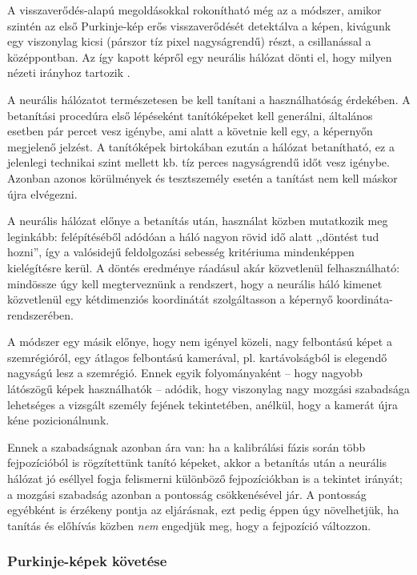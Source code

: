 \bigskip

A visszaverődés-alapú megoldásokkal rokonítható még az a módszer, amikor szintén az első Purkinje-kép erős visszaverődését detektálva a képen, kivágunk egy viszonylag kicsi (párszor tíz pixel nagyságrendű) részt, a csillanással a középpontban. Az így kapott képről egy neurális hálózat dönti el, hogy milyen nézeti irányhoz tartozik \cite{baluja}.

A neurális hálózatot természetesen be kell tanítani a használhatóság érdekében. A betanítási procedúra első lépéseként tanítóképeket kell generálni, általános esetben pár percet vesz igénybe, ami alatt a követnie kell egy, a képernyőn megjelenő jelzést. A tanítóképek birtokában ezután a hálózat betanítható, ez a jelenlegi technikai szint mellett kb. tíz perces nagyságrendű időt vesz igénybe. Azonban azonos körülmények és tesztszemély esetén a tanítást nem kell máskor újra elvégezni.

A neurális hálózat előnye a betanítás után, használat közben mutatkozik meg leginkább: felépítéséből adódóan a háló nagyon rövid idő alatt ,,döntést tud hozni'', így a valósidejű feldolgozási sebesség kritériuma mindenképpen kielégítésre kerül. A döntés eredménye ráadásul akár közvetlenül felhasználható: mindössze úgy kell megterveznünk a rendszert, hogy a neurális háló kimenet közvetlenül egy kétdimenziós koordinátát szolgáltasson a képernyő koordináta-rendszerében.

A módszer egy másik előnye, hogy nem igényel közeli, nagy felbontású képet a szemrégióról, egy átlagos felbontású kamerával, pl. kartávolságból is elegendő nagyságú lesz a szemrégió. Ennek egyik folyományaként -- hogy nagyobb látószögű képek használhatók -- adódik, hogy viszonylag nagy mozgási szabadsága lehetséges a vizsgált személy fejének tekintetében, anélkül, hogy a kamerát újra kéne pozicionálnunk.

Ennek a szabadságnak azonban ára van: ha a kalibrálási fázis során több fejpozícióból is rögzítettünk tanító képeket, akkor a betanítás után a neurális hálózat jó eséllyel fogja felismerni különböző fejpozíciókban is a tekintet irányát; a mozgási szabadság azonban a pontosság csökkenésével jár. A pontosság egyébként is érzékeny pontja az eljárásnak, ezt pedig éppen úgy növelhetjük, ha tanítás és előhívás közben \emph{nem} engedjük meg, hogy a fejpozíció változzon.

\subsubsection{Purkinje-képek követése}\label{sect:purkinje}

